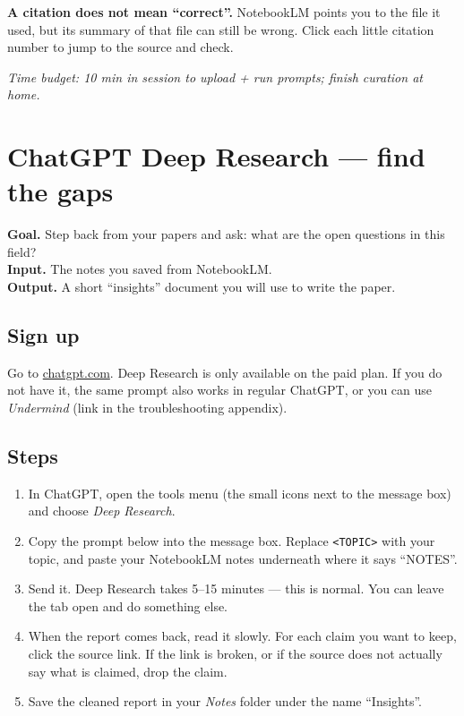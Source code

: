\documentclass[11pt,a4paper]{article}
\begin{document}
\begin{watchout}
\textbf{A citation does not mean ``correct''.} NotebookLM points you to the file it used, but its summary of that file can still be wrong. Click each little citation number to jump to the source and check.
\end{watchout}

\textit{Time budget: 10 min in session to upload + run prompts; finish curation at home.}

\section{ChatGPT Deep Research --- find the gaps}
\label{sec:cgdr}

\begin{toolheader}
\textbf{Goal.} Step back from your papers and ask: what are the open questions in this field?\\
\textbf{Input.} The notes you saved from NotebookLM.\\
\textbf{Output.} A short ``insights'' document you will use to write the paper.
\end{toolheader}

\subsection*{Sign up}
Go to \href{https://chatgpt.com/}{chatgpt.com}. Deep Research is only available on the paid plan. If you do not have it, the same prompt also works in regular ChatGPT, or you can use \emph{Undermind} (link in the troubleshooting appendix).

\subsection*{Steps}
\begin{enumerate}[leftmargin=*, itemsep=2pt]
  \item In ChatGPT, open the tools menu (the small icons next to the message box) and choose \emph{Deep Research}.
  \item Copy the prompt below into the message box. Replace \texttt{<TOPIC>} with your topic, and paste your NotebookLM notes underneath where it says ``NOTES''.
  \item Send it. Deep Research takes 5--15 minutes --- this is normal. You can leave the tab open and do something else.
  \item When the report comes back, read it slowly. For each claim you want to keep, click the source link. If the link is broken, or if the source does not actually say what is claimed, drop the claim.
  \item Save the cleaned report in your \emph{Notes} folder under the name ``Insights''.
\end{enumerate}
\end{document}
